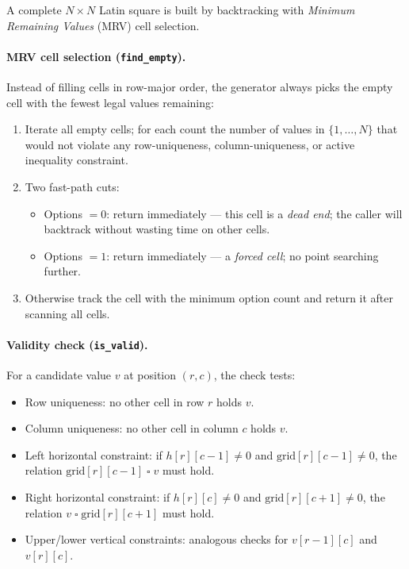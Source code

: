 A complete $N \times N$ Latin square is built by backtracking with
\emph{Minimum Remaining Values} (MRV) cell selection.

\paragraph{MRV cell selection (\texttt{find\_empty}).}
Instead of filling cells in row-major order, the generator always picks the
empty cell with the fewest legal values remaining:

\begin{enumerate}
  \item Iterate all empty cells; for each count the number of values in
        $\{1, \ldots, N\}$ that would not violate any row-uniqueness,
        column-uniqueness, or active inequality constraint.
  \item Two fast-path cuts:
        \begin{itemize}
          \item Options $= 0$: return immediately — this cell is a \emph{dead end};
                the caller will backtrack without wasting time on other cells.
          \item Options $= 1$: return immediately — a \emph{forced cell};
                no point searching further.
        \end{itemize}
  \item Otherwise track the cell with the minimum option count and return it
        after scanning all cells.
\end{enumerate}

\paragraph{Validity check (\texttt{is\_valid}).}
For a candidate value $v$ at position $(r,c)$, the check tests:
\begin{itemize}
  \item Row uniqueness: no other cell in row $r$ holds $v$.
  \item Column uniqueness: no other cell in column $c$ holds $v$.
  \item Left horizontal constraint: if $h[r][c-1] \ne 0$ and $\text{grid}[r][c-1] \ne 0$,
        the relation $\text{grid}[r][c-1] \;\square\; v$ must hold.
  \item Right horizontal constraint: if $h[r][c] \ne 0$ and $\text{grid}[r][c+1] \ne 0$,
        the relation $v \;\square\; \text{grid}[r][c+1]$ must hold.
  \item Upper/lower vertical constraints: analogous checks for $v[r-1][c]$ and
        $v[r][c]$.
\end{itemize}


